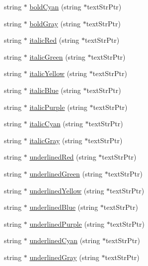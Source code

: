 \begin{DoxyCompactItemize}
\item 
string $\ast$ \hyperlink{namespace_unix_console_text_a3d44cc293cdf1d6ac9a24d7a3e9ab478}{bold\-Cyan} (string $\ast$text\-Str\-Ptr)
\item 
string $\ast$ \hyperlink{namespace_unix_console_text_a1a2cdea64ebb3bbb3f1ee7dae5c055be}{bold\-Gray} (string $\ast$text\-Str\-Ptr)
\item 
string $\ast$ \hyperlink{namespace_unix_console_text_aed8761d2771d1fa621e2f3928e174e1b}{italic\-Red} (string $\ast$text\-Str\-Ptr)
\item 
string $\ast$ \hyperlink{namespace_unix_console_text_a875365603984800fdbf0649fbb23c152}{italic\-Green} (string $\ast$text\-Str\-Ptr)
\item 
string $\ast$ \hyperlink{namespace_unix_console_text_a945b2e41b70a7d47c31c64c25ea10e30}{italic\-Yellow} (string $\ast$text\-Str\-Ptr)
\item 
string $\ast$ \hyperlink{namespace_unix_console_text_aec7de79e37db887a2eb624a2e7c1eb0a}{italic\-Blue} (string $\ast$text\-Str\-Ptr)
\item 
string $\ast$ \hyperlink{namespace_unix_console_text_a7513fc0bb382e2b32a1166a296f90e05}{italic\-Purple} (string $\ast$text\-Str\-Ptr)
\item 
string $\ast$ \hyperlink{namespace_unix_console_text_a82f73127ee8f185170df031d290d9dc6}{italic\-Cyan} (string $\ast$text\-Str\-Ptr)
\item 
string $\ast$ \hyperlink{namespace_unix_console_text_a8fed8b51dfa438319353f7bda5059476}{italic\-Gray} (string $\ast$text\-Str\-Ptr)
\item 
string $\ast$ \hyperlink{namespace_unix_console_text_a10edd17118d2819c67589c1309811140}{underlined\-Red} (string $\ast$text\-Str\-Ptr)
\item 
string $\ast$ \hyperlink{namespace_unix_console_text_a328b088a295baf73367c12177165f4e0}{underlined\-Green} (string $\ast$text\-Str\-Ptr)
\item 
string $\ast$ \hyperlink{namespace_unix_console_text_a205ee04b676b2aebb5ae323839f8de45}{underlined\-Yellow} (string $\ast$text\-Str\-Ptr)
\item 
string $\ast$ \hyperlink{namespace_unix_console_text_a1fe323c83240f6985f0b2c4625cddda3}{underlined\-Blue} (string $\ast$text\-Str\-Ptr)
\item 
string $\ast$ \hyperlink{namespace_unix_console_text_a5870113f7101f12405d9a1ff675a2fc1}{underlined\-Purple} (string $\ast$text\-Str\-Ptr)
\item 
string $\ast$ \hyperlink{namespace_unix_console_text_ad29ff223c9f8745e6ed7e0994b36a629}{underlined\-Cyan} (string $\ast$text\-Str\-Ptr)
\item 
string $\ast$ \hyperlink{namespace_unix_console_text_a67d5c2e42c36ff8ae618643a1e9e0523}{underlined\-Gray} (string $\ast$text\-Str\-Ptr)
\end{DoxyCompactItemize}


